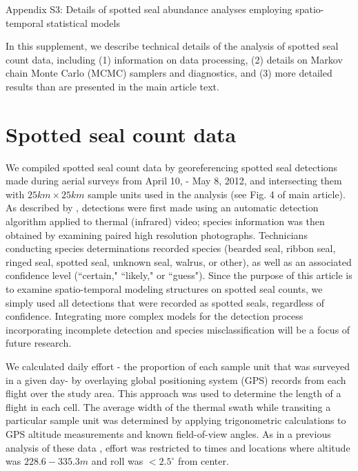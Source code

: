\documentclass[12pt,fleqn]{article}
\begin{document}
\rm \begin{flushleft}

\raggedbottom
\vspace{.5in}


\begin{center}
Appendix S3: Details of spotted seal abundance analyses employing spatio-temporal statistical models
\bigskip
\end{center}

\doublespacing
In this supplement, we describe technical details of the analysis of spotted seal count data, including (1) information on data processing, (2) details on Markov chain Monte Carlo (MCMC) samplers and diagnostics, and (3) more detailed results than are presented in the main article text.

\section{Spotted seal count data}

We compiled spotted seal count data by georeferencing spotted seal detections made during aerial surveys from April 10, - May 8, 2012, and intersecting them with $25km \times 25km$ sample units used in the analysis (see Fig. 4 of main article).  As described by \citet{ConnEtAl2014}, detections were first made using an automatic detection algorithm applied to thermal (infrared) video; species information was then obtained by examining paired high resolution photographs.  Technicians conducting species determinations recorded species (bearded seal, ribbon seal, ringed seal, spotted seal, unknown seal, walrus, or other), as well as an associated confidence level (``certain," ``likely," or ``guess").  Since the purpose of this article is to examine spatio-temporal modeling structures on spotted seal counts, we simply used all detections that were recorded as spotted seals, regardless of confidence.  Integrating more complex models for the detection process incorporating incomplete detection and species misclassification \citep[see e.g.,][]{ConnEtAl2014} will be a focus of future research.

\hspace{.5in} We calculated daily effort - the proportion of each sample unit that was surveyed in a given day- by overlaying global positioning system (GPS) records from each flight over the study area.  This approach was used to determine the length of a flight in each cell.  The average width of the thermal swath while transiting a particular sample unit was determined by applying trigonometric calculations to GPS altitude measurements and known field-of-view angles.  As in a previous analysis of these data \citep{ConnEtAl2014}, effort was restricted to times and locations where altitude was $228.6-335.3m$ and roll was $<2.5^\circ$ from center.


\end{flushleft}
\end{document}
